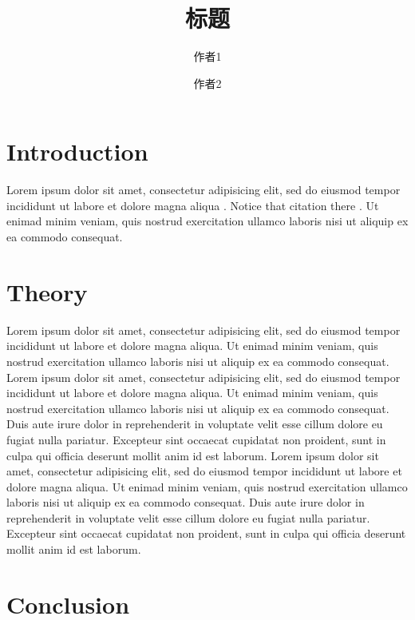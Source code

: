 \documentclass[]{article}
\title{标题}
\author{作者1 \and 作者2}
\date{}
\begin{document}
\maketitle

{
\hypersetup{linkcolor=black}
\setcounter{tocdepth}{2}
\tableofcontents
}
\section{Introduction}\label{introduction}

Lorem ipsum dolor sit amet, consectetur adipisicing elit, sed do eiusmod
tempor incididunt ut labore et dolore magna aliqua
\autocite{fourcade13classsituat}. Notice that citation there
\autocite{healy02digittechnculturgoods}. Ut enimad minim veniam, quis
nostrud exercitation ullamco laboris nisi ut aliquip ex ea commodo
consequat.

\section{Theory}\label{theory}

Lorem ipsum dolor sit amet, consectetur adipisicing elit, sed do eiusmod
tempor incididunt ut labore et dolore magna aliqua. Ut enimad minim
veniam, quis nostrud exercitation ullamco laboris nisi ut aliquip ex ea
commodo consequat. Lorem ipsum dolor sit amet, consectetur adipisicing
elit, sed do eiusmod tempor incididunt ut labore et dolore magna aliqua.
Ut enimad minim veniam, quis nostrud exercitation ullamco laboris nisi
ut aliquip ex ea commodo consequat. Duis aute irure dolor in
reprehenderit in voluptate velit esse cillum dolore eu fugiat nulla
pariatur. Excepteur sint occaecat cupidatat non proident, sunt in culpa
qui officia deserunt mollit anim id est laborum. Lorem ipsum dolor sit
amet, consectetur adipisicing elit, sed do eiusmod tempor incididunt ut
labore et dolore magna aliqua. Ut enimad minim veniam, quis nostrud
exercitation ullamco laboris nisi ut aliquip ex ea commodo consequat.
Duis aute irure dolor in reprehenderit in voluptate velit esse cillum
dolore eu fugiat nulla pariatur. Excepteur sint occaecat cupidatat non
proident, sunt in culpa qui officia deserunt mollit anim id est laborum.

\section{Conclusion}\label{conclusion}
\end{document}
